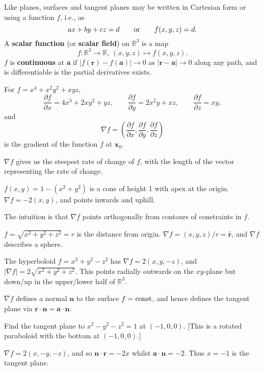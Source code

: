 \documentclass[letter-paper]{tufte-book}
\newenvironment{example}[1][Example]{\begin{trivlist}
\item[\hskip \labelsep {\bfseries #1}]}{\end{trivlist}}
\newcommand{\dy}{\partial}
\newcommand{\ddy}[2]{\frac{\dy#1}{\dy#2}}
\newcommand{\ab}{\boldsymbol{a}}
\newcommand{\nb}{\boldsymbol{n}}
\newcommand{\xb}{\boldsymbol{x}}
\newcommand\Def[1]{\textbf{#1}}
\begin{document}
Like planes, surfaces and tangent planes may be written in Cartesian form or
using a function $f$, i.e., as
\begin{equation*}
	ax+by+cz=d\qquad\textnormal{or}\qquad f(x,y,z)=d.
\end{equation*}
A \Def{scalar function} (or \Def{scalar field}) on $\mathbb{R}^3$ is
a map
\begin{equation*}
	f:\mathbb{R}^3\rightarrow\mathbb{R},\ (x,y,z)\mapsto f(x,y,z).
\end{equation*}
$f$ is \Def{continuous} at $\ab$ if
$|f(\boldsymbol{r})-f(\ab)|\rightarrow0$ as $|\boldsymbol{r}-\ab|\rightarrow0$
along any path, and is differentiable is the partial derivatives exists.
\begin{example}
	For $f=x^4+x^2y^2+xyz$,
	\begin{equation*}
		\ddy{f}{x}=4x^3+2xy^2+yz,\qquad \ddy{f}{y}=2x^2y+xz,\qquad
		\ddy{f}{z}=xy,
	\end{equation*}
	and
	\begin{equation}
		\nabla f=\left(\ddy{f}{x},\ddy{f}{y},\ddy{f}{z}\right)
	\end{equation}
	is the gradient of the function $f$ at $\xb_0$.
\end{example}
$\nabla f$ gives us the steepest rate of change of $f$, with the length of the
vector representing the rate of change.
\begin{example}
	$f(x,y)=1-(x^2+y^2)$ is a cone of height 1 with apex at the origin. $\nabla
	f=-2(x,y)$, and points inwards and uphill.
\end{example}
The intuition is that $\nabla f$ points orthogonally from contours of constraints
in $f$.
\begin{example}
	$f=\sqrt{x^2+y^2+z^2}=r$ is the distance from origin. $\nabla
	f=(x,y,z)/r=\hat{\boldsymbol{r}}$, and $\nabla f$ describes a sphere.
\end{example}
\begin{example}
	The hyperboloid $f=x^2+y^2-z^2$ has $\nabla f=2(x,y,-z)$, and $|\nabla
	f|=2\sqrt{x^2+y^2+z^2}$. This points radially outwards on the $xy$-plane but
	down/up in the upper/lower half of $\mathbb{R}^3$.
\end{example}
$\nabla f$ defines a normal $\nb$ to the surface $f=\textnormal{const}$, and
hence defines the tangent plane via $\boldsymbol{r}\cdot\nb=\ab\cdot\nb$.
\begin{example}
	Find the tangent plane to $x^2-y^2-z^2=1$ at $(-1,0,0)$. [This is a rotated
	paraboloid with the bottom at $(-1,0,0)$.]
	
	$\nabla f=2(x,-y,-z)$, and so $\nb\cdot\boldsymbol{r}=-2x$ whilst
	$\ab\cdot\nb=-2$. Thus $x=-1$ is the tangent plane.
\end{example}
\end{document}
